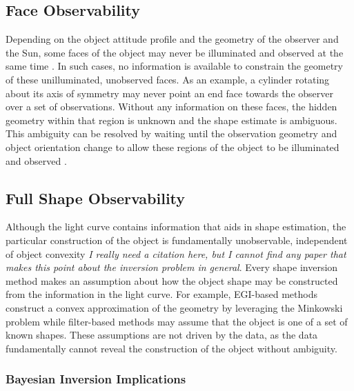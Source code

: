 \subsection{Face Observability}

Depending on the object attitude profile and the geometry of the observer and the Sun, some faces of the object may never be illuminated and observed at the same time \cite{fan2020thesis}. In such cases, no information is available to constrain the geometry of these unilluminated, unobserved faces. As an example, a cylinder rotating about its axis of symmetry may never point an end face towards the observer over a set of observations. Without any information on these faces, the hidden geometry within that region is unknown and the shape estimate is ambiguous. This ambiguity can be resolved by waiting until the observation geometry and object orientation change to allow these regions of the object to be illuminated and observed \cite{friedman2020}. 


\subsection{Full Shape Observability} \label{sec:full_shapes}

Although the light curve contains information that aids in shape estimation, the particular construction of the object is fundamentally unobservable, independent of object convexity \textit{I really need a citation here, but I cannot find any paper that makes this point about the inversion problem in general}. Every shape inversion method makes an assumption about how the object shape may be constructed from the information in the light curve. For example, EGI-based methods construct a convex approximation of the geometry by leveraging the Minkowski problem while filter-based methods may assume that the object is one of a set of known shapes. These assumptions are not driven by the data, as the data fundamentally cannot reveal the construction of the object without ambiguity.

\subsubsection{Bayesian Inversion Implications}

